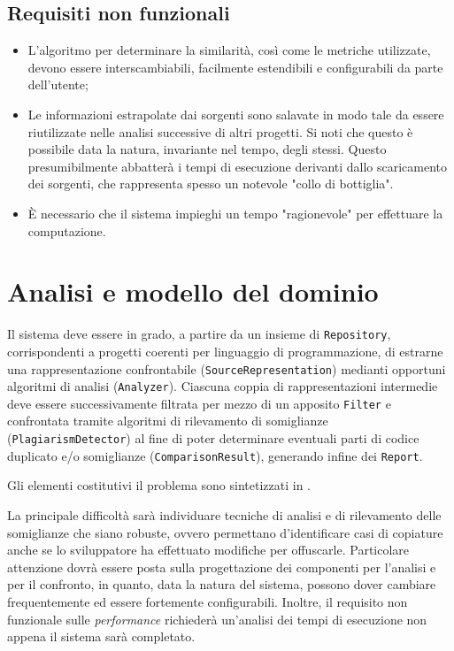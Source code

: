 \subsection*{Requisiti non funzionali}
\begin{itemize}
    \item L'algoritmo per determinare la similarità, così come le metriche utilizzate, devono essere interscambiabili, facilmente estendibili e configurabili da parte dell'utente;

    \item Le informazioni estrapolate dai sorgenti sono salavate in modo tale da essere riutilizzate nelle analisi successive di altri progetti. 
    Si noti che questo è possibile data la natura, invariante nel tempo, degli stessi.
    Questo presumibilmente abbatterà i tempi di esecuzione derivanti dallo scaricamento dei sorgenti, che rappresenta spesso un notevole "collo di bottiglia".

    \item \`E necessario che il sistema impieghi un tempo "ragionevole" per effettuare la computazione.
\end{itemize}

\section{Analisi e modello del dominio}
Il sistema deve essere in grado, a partire da un insieme di \texttt{Repository}, corrispondenti a progetti coerenti per linguaggio di programmazione, di estrarne una rappresentazione confrontabile (\texttt{SourceRepresentation}) medianti opportuni algoritmi di analisi (\texttt{Analyzer}).
%
Ciascuna coppia di rappresentazioni intermedie deve essere successivamente filtrata per mezzo di un apposito \texttt{Filter} e confrontata tramite algoritmi di rilevamento di somiglianze (\texttt{PlagiarismDetector}) al fine di poter determinare eventuali parti di codice duplicato e/o somiglianze (\texttt{ComparisonResult}), generando infine dei \texttt{Report}.

Gli elementi costitutivi il problema sono sintetizzati in .

La principale difficoltà sarà individuare tecniche di analisi e di rilevamento delle somiglianze che siano robuste, ovvero permettano d'identificare casi di copiature anche se lo sviluppatore ha effettuato modifiche per offuscarle.
%
Particolare attenzione dovrà essere posta sulla progettazione dei componenti per l'analisi e per il confronto, in quanto, data la natura del sistema, possono dover cambiare frequentemente ed essere fortemente configurabili.
%
Inoltre, il requisito non funzionale sulle \textit{performance} richiederà un'analisi dei tempi di esecuzione non appena il sistema sarà completato.

